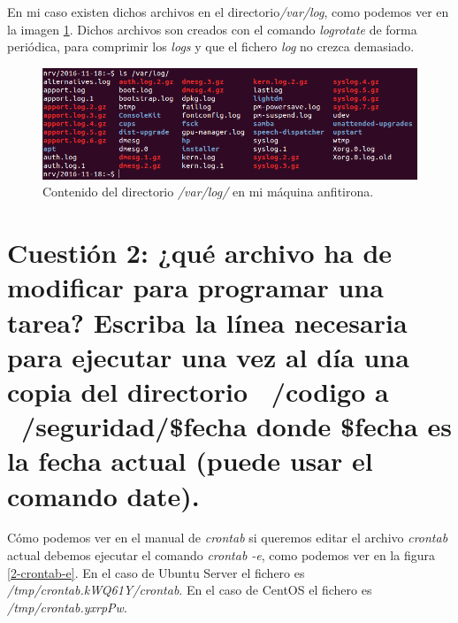 \documentclass[a4paper,titlepage,12pt]{scrartcl}	%
\numberwithin{figure}{section} %
\numberwithin{table}{section} %
\begin{document}
	En mi caso existen dichos archivos en el directorio\textit{/var/log}, como podemos ver en la imagen \ref{1-archivos_gz}. Dichos archivos son creados con el comando \textit{logrotate} \cite{logrotate} de forma periódica, para comprimir los \textit{logs} y que el fichero \textit{log} no crezca demasiado.
	
	\begin{figure}[H]
		\includegraphics[width=\linewidth]{./Imagenes/1-archivos_gz.png}
		\vspace{-0.5cm}
		\caption[Contenido del directorio \textit{/var/log/} en mi máquina anfitirona.]{Contenido del directorio \textit{/var/log/} en mi máquina anfitirona.}
		\label{1-archivos_gz}
	\end{figure}

	\section[Cuestión 2: ¿qué archivo ha de modificar para programar una tarea? Escriba la línea necesaria para ejecutar una vez al día una copia del directorio ~/codigo a ~/seguridad/\$fecha donde \$fecha es la fecha actual (puede usar el comando date).]{Cuestión 2: ¿qué archivo ha de modificar para programar una tarea? Escriba la línea necesaria para ejecutar una vez al día una copia del directorio ~/codigo a ~/seguridad/\$fecha donde \$fecha es la fecha actual (puede usar el comando date).}
	
	Cómo podemos ver en el manual de \textit{crontab} \cite{crontab} si queremos editar el archivo \textit{crontab} actual debemos ejecutar el comando \textit{crontab -e}, como podemos ver en la figura \ref{2-crontab-e}. En el caso de Ubuntu Server el fichero es \textit{/tmp/crontab.kWQ61Y/crontab}. En el caso de CentOS el fichero es \textit{/tmp/crontab.yxrpPw}.
	
\end{document}
